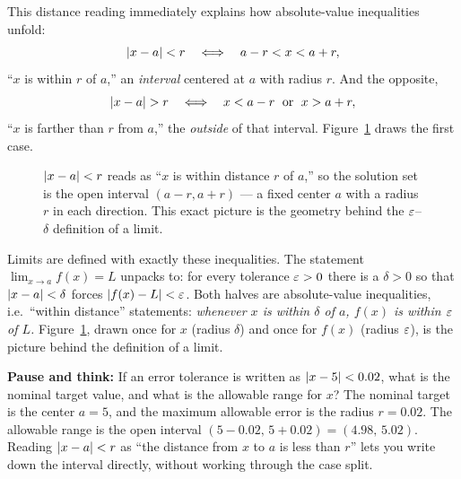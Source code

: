 This distance reading immediately explains how absolute-value inequalities unfold:
\[
  \lvert x-a\rvert < r \quad\Longleftrightarrow\quad a - r < x < a + r,
\]
``$x$ is within $r$ of $a$,'' an \emph{interval} centered at $a$ with radius $r$.
And the opposite,
\[
  \lvert x-a\rvert > r \quad\Longleftrightarrow\quad x < a-r \;\text{ or }\; x > a+r,
\]
``$x$ is farther than $r$ from $a$,'' the \emph{outside} of that interval.
Figure~\ref{ch40:fig-absval} draws the first case.

\begin{figure}[htbp]
\centering
{}
\caption{$\lvert x-a\rvert<r$ reads as ``$x$ is within distance $r$ of $a$,'' so the
solution set is the open interval $(a-r,a+r)$ --- a fixed center $a$ with a radius
$r$ in each direction. This exact picture is the geometry behind the
$\varepsilon$--$\delta$ definition of a limit.}
\label{ch40:fig-absval}
\end{figure}

\begin{connectionbox}
Limits are defined with exactly these inequalities. The statement
$\lim_{x\to a} f(x) = L$ unpacks to: for every tolerance $\varepsilon>0$ there is a
$\delta>0$ so that $\lvert x-a\rvert<\delta$ forces $\lvert f(x)-L\rvert<\varepsilon$. Both halves are
absolute-value inequalities, i.e.\ ``within distance'' statements: \emph{whenever
$x$ is within $\delta$ of $a$, $f(x)$ is within $\varepsilon$ of $L$.}
Figure~\ref{ch40:fig-absval}, drawn once for $x$ (radius $\delta$) and once for
$f(x)$ (radius $\varepsilon$), is the picture behind the definition of a limit.
\end{connectionbox}

\begin{recoverybox}
\textbf{Pause and think:} If an error tolerance is written as $\lvert x - 5\rvert < 0.02$,
what is the nominal target value, and what is the allowable range for $x$?
The nominal target is the center $a = 5$, and the maximum allowable error is the
radius $r = 0.02$. The allowable range is the open interval
$(5 - 0.02,\, 5 + 0.02) = (4.98,\, 5.02)$. Reading $\lvert x-a\rvert < r$ as ``the distance
from $x$ to $a$ is less than $r$'' lets you write down the interval directly,
without working through the case split.
\end{recoverybox}

